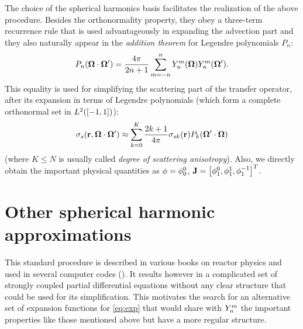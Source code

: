 The choice of the spherical harmonics basis facilitates the realization of the above procedure. Besides the
orthonormality property, they obey a three-term recurrence rule that is used advantageously in expanding the advection
part
and they also naturally appear in the \textit{addition theorem} for Legendre polynomials $P_n$:
\begin{equation}\label{eq:addition}
  P_n(\bomega\cdot\bomega') = \frac{4\pi}{2n+1}\suma[m]{-n}{n}\Y{n}{m}(\bomega)\Y{n}{m}(\bomega').
\end{equation}
This equality is used for simplifying the scattering part of the transfer operator, after its expansion in terms of 
Legendre polynomials (which form a complete orthonormal set in $\Lp[2]([-1,1])$):
\begin{equation}\label{eq:exp2}
  \sigma_s(\br,\bomega\cdot\bomega') \approx \suma[k]{0}{K}
      \frac{2k+1}{4\pi}\sigma_{sk}(\br)P_k(\bomega'\cdot\bomega)
\end{equation}
(where $K \leq N$ is usually called \textit{degree of scattering anisotropy}).
Also, we directly obtain the important physical quantities as $\phi = \angmom{0}{0}$, $\mathbf{J} = \bigl[\angmom{1}{0},\angmom{1}{1},\angmom{1}{-1}\bigr]^T$.

\section{Other spherical harmonic approximations}
This standard procedure is described in various books on reactor physics and used in several computer codes
(\cite{MARC,Capilla,vanCriekingen1}). It results however in a complicated set of strongly coupled partial differential
equations without any clear structure that could be used for its simplification. This motivates the search for an
alternative set of expansion functions for \eqref{eq:exp} that would share with $\Y{n}{m}$ the important properties like
those mentioned above but have a more regular structure.

